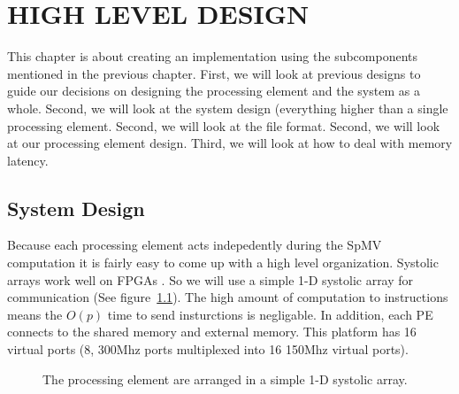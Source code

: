 \chapter{HIGH LEVEL DESIGN}
\label{chp:high_level_design}
This chapter is about creating an implementation using the subcomponents mentioned in the previous chapter. First, we will look at previous designs to guide our decisions on designing the processing element and the system as a whole. Second, we will look at the system design (everything higher than a single processing element. Second, we will look at the file format. Second, we will look at our processing element design. Third, we will look at how to deal with memory latency.
\section{System Design}
Because each processing element acts indepedently during the SpMV computation it is fairly easy to come up with a high level organization. Systolic arrays work well on FPGAs \cite{prelim:johnson}. So we will use a simple 1-D systolic array for communication (See figure~\ref{fig:systolic_array}). The high amount of computation to instructions means the $O(p)$ time to send insturctions is negligable. In addition, each PE connects to the shared memory and external memory. This platform has 16 virtual ports (8, 300Mhz ports multiplexed into 16 150Mhz virtual ports).
\begin{figure}
    \centering
    \caption[The 1-D Systolic array structure of processing elements.]{The processing element are arranged in a simple 1-D systolic array.}
    \label{fig:systolic_array}
\end{figure}
